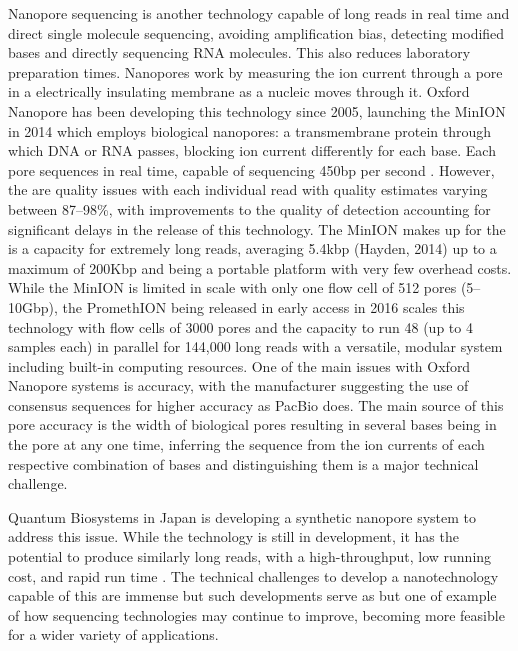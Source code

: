 Nanopore sequencing is another technology capable of long reads in real time and direct single molecule sequencing, avoiding amplification bias, detecting modified bases and directly sequencing RNA molecules. This also reduces laboratory preparation times. Nanopores work by measuring the ion current through a pore in a electrically insulating membrane as a nucleic moves through it. Oxford Nanopore has been developing this technology since 2005, launching the MinION in 2014 which employs biological nanopores: a transmembrane protein through which DNA or RNA passes, blocking ion current differently for each base. Each pore sequences in real time, capable of sequencing 450bp per second \citep{nanoporetech}. However, the are quality issues with each individual read with quality estimates varying between 87--98\%, with improvements to the quality of detection accounting for significant delays in the release of this technology. The MinION makes up for the is a capacity for extremely long reads, averaging 5.4kbp (Hayden, 2014) up to a maximum of 200Kbp and being a portable platform with very few overhead costs. While the MinION is limited in scale with only one flow cell of 512 pores (5--10Gbp), the PromethION being released in early access in 2016 scales this technology with flow cells of 3000 pores and the capacity to run 48 (up to 4 samples each) in parallel for 144,000 long reads with a versatile, modular system including built-in computing resources. One of the main issues with Oxford Nanopore systems is accuracy, with the manufacturer suggesting the use of consensus sequences for higher accuracy as PacBio does. The main source of this pore accuracy is the width of biological pores resulting in several bases being in the pore at any one time, inferring the sequence from the ion currents of each respective combination of bases and distinguishing them is a major technical challenge.

Quantum Biosystems in Japan is developing a synthetic nanopore system to address this issue. While the technology is still in development, it has the potential to produce similarly long reads, with a high-throughput, low running cost, and rapid run time \citep{quantumbiosystems}. The technical challenges to develop a nanotechnology capable of this are immense but such developments serve as but one of example of how sequencing technologies may continue to improve, becoming more feasible for a wider variety of applications.


